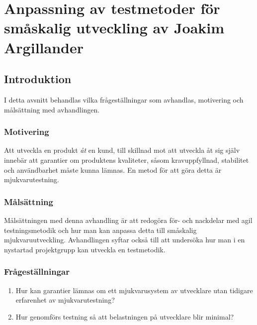 \chapter{Anpassning av testmetoder för småskalig utveckling av Joakim Argillander}
\section{Introduktion}
I detta avsnitt behandlas vilka frågeställningar som avhandlas, motivering och målsättning med avhandlingen.
\label{cha:joakim-introduction}

\subsection{Motivering}
\label{sec:joakim-motivation}
Att utveckla en produkt \emph{åt} en kund, till skillnad mot att utveckla åt sig själv innebär att garantier om produktens kvaliteter, såsom kravuppfyllnad, stabilitet och användbarhet måste kunna lämnas. En metod för att göra detta är mjukvarutestning. 


\subsection{Målsättning}
\label{sec:joakim-aim}
Målsättningen med denna avhandling är att redogöra för- och nackdelar med agil testningsmetodik och hur man kan anpassa detta till småskalig mjukvaruutveckling. Avhandlingen syftar också till att undersöka hur man i en nystartad projektgrupp kan utveckla en testmetodik. 

\subsection{Frågeställningar}
\label{sec:joakim-research-questions}


\begin{enumerate}
\item Hur kan garantier lämnas om ett mjukvarusystem av utvecklare utan tidigare erfarenhet av mjukvarutestning?
\item Hur genomförs testning så att belastningen på utvecklare blir minimal? 
\end{enumerate}

